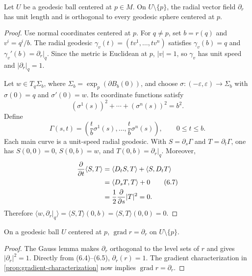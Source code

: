\begin{theorem}
\label{thm:gauss-lemma}


Let $U$ be a geodesic ball centered at $p\in M$.  On
$U\setminus\{p\}$, the radial vector field $\partial_r$ has unit length and is
orthogonal to every geodesic sphere centered at $p$.
\end{theorem}

\begin{proof}
\sketch
Use normal coordinates centered at $p$.  For $q\ne p$, set $b=r(q)$ and
$v^i=q^i/b$.  The radial geodesic $\gamma_v(t)=(tv^1,\ldots,tv^n)$ satisfies
$\gamma_v(b)=q$ and $\gamma_v'(b)=\partial_r|_q$.  Since the metric is
Euclidean at $p$, $|v|=1$, so $\gamma_v$ has unit speed and
$|\partial_r|_q=1$.

Let $w\in T_q\Sigma_b$, where
$\Sigma_b=\exp_p(\partial B_b(0))$, and choose
$\sigma:(-\varepsilon,\varepsilon)\to\Sigma_b$ with
$\sigma(0)=q$ and $\sigma'(0)=w$.  Its coordinate functions satisfy
\begin{equation}
(\sigma^1(s))^2 + \cdots + (\sigma^n(s))^2 = b^2. \tag{6.6}
\end{equation}
Define
\[
\Gamma(s,t)=\left(\frac{t}{b}\sigma^1(s),\ldots,
\frac{t}{b}\sigma^n(s)\right),
\qquad 0\leq t\leq b.
\]
Each main curve is a unit-speed radial geodesic.  With
$S=\partial_s\Gamma$ and $T=\partial_t\Gamma$, one has
$S(0,0)=0$, $S(0,b)=w$, and $T(0,b)=\partial_r|_q$.  Moreover,
\begin{align}
\frac{\partial}{\partial t}\langle S,T\rangle
&=\langle D_tS,T\rangle+\langle S,D_tT\rangle \notag\\
&=\langle D_sT,T\rangle+0 \tag{6.7}\\
&=\frac12\frac{\partial}{\partial s}|T|^2=0. \notag
\end{align}
Therefore $\langle w,\partial_r|_q\rangle
=\langle S,T\rangle(0,b)=\langle S,T\rangle(0,0)=0$.
\end{proof}

\begin{corollary}
\label{cor:gradient-radial-distance}


On a geodesic ball $U$ centered at $p$,
$\operatorname{grad}r=\partial_r$ on $U\setminus\{p\}$.
\end{corollary}

\begin{proof}
\sketch
The Gauss lemma makes $\partial_r$ orthogonal to the level sets of $r$ and
gives $|\partial_r|^2=1$.  Directly from (6.4)--(6.5),
$\partial_r(r)=1$.  The gradient characterization in
\cref{prop:gradient-characterization} now
implies $\operatorname{grad}r=\partial_r$.
\end{proof}

